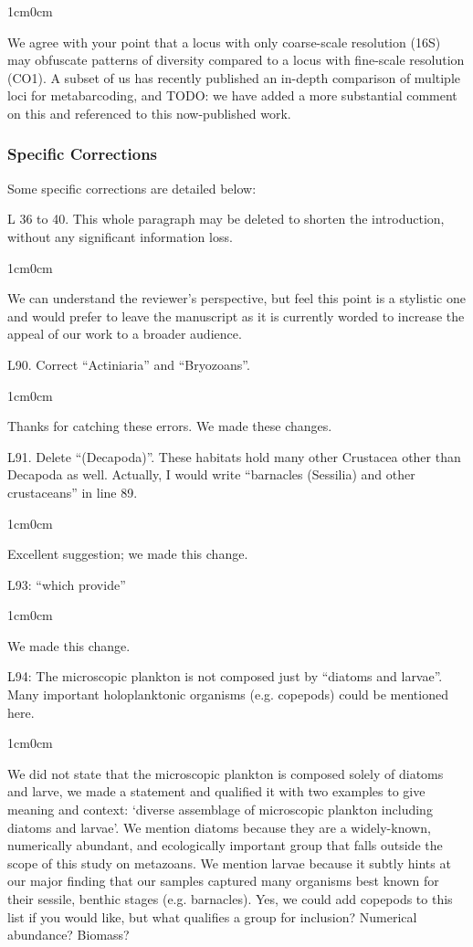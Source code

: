 \documentclass{article}
\newenvironment{response}
	{
	\begin{adjustwidth}{1cm}{0cm}
	\itshape %
	}
	{
	\end{adjustwidth}
	}
\begin{document}
\begin{response}
	We agree with your point that a locus with only coarse-scale resolution (16S) may obfuscate patterns of diversity compared to a locus with fine-scale resolution (CO1). A subset of us has recently published an in-depth comparison of multiple loci for metabarcoding, and TODO: we have added a more substantial comment on this and referenced to this now-published work.
\\
\end{response}

\subsubsection*{Specific Corrections}
Some specific corrections are detailed below:

L 36 to 40. This whole paragraph may be deleted to shorten the introduction, without any significant information loss.
\begin{response}
  We can understand the reviewer's perspective, but feel this point is a stylistic one and would prefer to leave the manuscript as it is currently worded to increase the appeal of our work to a broader audience.\\
\end{response}

L90. Correct “Actiniaria” and “Bryozoans”.
\begin{response}
  Thanks for catching these errors. We made these changes.\\
\end{response}

L91. Delete “(Decapoda)”. These habitats hold many other Crustacea other than Decapoda as well. Actually, I would write “barnacles (Sessilia) and other crustaceans” in line 89.
\begin{response}
  Excellent suggestion; we made this change.\\
\end{response}

L93: “which provide”
\begin{response}
  We made this change.\\
\end{response}

L94: The microscopic plankton is not composed just by “diatoms and larvae”. Many important holoplanktonic organisms (e.g. copepods) could be mentioned here.
\begin{response}
  We did not state that the microscopic plankton is composed solely of diatoms and larve, we made a  statement and qualified it with two examples to give meaning and context: `diverse assemblage of microscopic plankton including diatoms and larvae'. We mention diatoms because they are a widely-known, numerically abundant, and ecologically important group that falls outside the scope of this study on metazoans. We mention larvae because it subtly hints at our major finding that our samples captured many organisms best known for their sessile, benthic stages (e.g. barnacles). Yes, we could add copepods to this list if you would like, but what qualifies a group for inclusion? Numerical abundance? Biomass?\\
\end{response}
\end{document}
